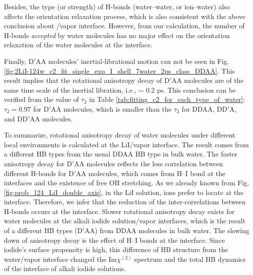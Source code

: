 Besides, the type (or strength) of H-bonds (water--water, or ion--water) 
also affects the orientation relaxation process, which is also consistent with the above conclusion about \LiN/vapor interface. 
However, from our calculation, the number of H-bonds \emph{accepted} by water molecules has no major effect on the orientation relaxation of the water molecules at the interface.

Finally, D$'$AA molecules' inertial-librational motion can not be seen in Fig.\thinspace\ref{fig:2LiI-124w_c2_fit_single_exp_I_shell_7water_2ps_class_DDAA}. 
This result implies that the rotational anisotropy decay of D$'$AA molecules
are of the same time scale of the inertial libration, i.e., $\sim$ 0.2 ps. 
This conclusion can be verified from the value of $\tau_{2}$ in Table \ref{tab:fitting_c2_for_each_type_of_water}: $\tau_{2}=0.97$ for D$'$AA molecules, 
which is smaller than the $\tau_{2}$ for DDAA, DD$'$A, and DD$'$AA molecules.
%

To summarize, rotational anisotropy decay of water molecules under different local environments is calculated at the LiI/vapor interface. 
The result comes from a different HB types from the usual DDAA HB type in bulk water.
The faster anisotropy decay for D$'$AA molecules reflects the less correlation between different H-bonds for D$'$AA molecules, 
which comes from H--I bond at the interfaces and the existence of free OH stretching.
As we already known from Fig.\thinspace\ref{fig:prob_124_LiI_double_axis}, in the LiI solution, 
\I ions prefer to locate at the interface.  
Therefore, we infer that the reduction of the inter-correlations between H-bonds occurs at the interface. 
Slower rotational anisotropy decay exists for water molecules  at the alkali iodide solution/vapor interfaces, 
which is the result of a different HB types (D$'$AA) from DDAA molecules in bulk water. 
The slowing down of anisotropy decay is the effect of H--I bonds at the interface. 
Since iodide's surface propensity is high, this difference of HB structure from the water/vapor interface changed 
the Im$\chi^{(2)}$ spectrum and the total HB dynamics of the interface of alkali iodide solutions.  

